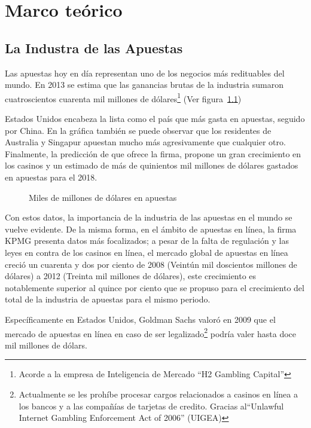 \graphicspath{{/Users/brunomedina/Dropbox/Tesis-Egobets/egobets-notas/resources/marco/}}
\chapter{Marco teórico}
\section{La Industra de las Apuestas}
Las apuestas hoy en día representan uno de los negocios más redituables del mundo. En 2013 se estima que las ganancias brutas de la industria sumaron cuatroscientos cuarenta mil millones de dólares\footnote{Acorde a la empresa de Inteligencia de Mercado ``H2 Gambling Capital''\cite{economistHouseWins}} (Ver figura~\ref{Fig:gasto-apuestas}) 

Estados Unidos encabeza la lista como el país que más gasta en apuestas, seguido por China. En la gráfica también se puede observar que los residentes de Australia y Singapur apuestan mucho más agresivamente que cualquier otro. Finalmente, la predicción de que ofrece la firma, propone un gran crecimiento en los casinos y un estimado de más de quinientos mil millones de dólares gastados en apuestas para el 2018.


\begin{figure}[!htb]\centering
   \begin {minipage}{0.85\textwidth}
     \caption{Miles de millones de dólares en apuestas}\label{Fig:gasto-apuestas}
   \end{minipage}
\end{figure}

Con estos datos, la importancia de la industria de las apuestas en el mundo se vuelve evidente. De la misma forma, en el ámbito de apuestas en línea, la firma KPMG\cite{kpmgOnlineGaming} presenta datos más focalizados; a pesar de la falta de regulación y las leyes en contra de los casinos en línea, el mercado global de apuestas en línea creció un cuarenta y dos por ciento de 2008 (Veintún mil doscientos millones de dólares) a 2012 (Treinta mil millones de dólares), este crecimiento es notablemente superior al quince por ciento que se propuso para el crecimiento del total de la industria de apuestas para el mismo periodo.

Específicamente en Estados Unidos, Goldman Sachs valoró en 2009 que el mercado de apuestas en línea en caso de ser legalizado\footnote{Actualmente se les prohíbe procesar cargos relacionados a casinos en línea a los bancos y a las compañías de tarjetas de credito. Gracias al``Unlawful Internet Gambling Enforcement Act of 2006'' (UIGEA)} podría valer hasta doce mil millones de dólars.\cite{goldmanParty}

